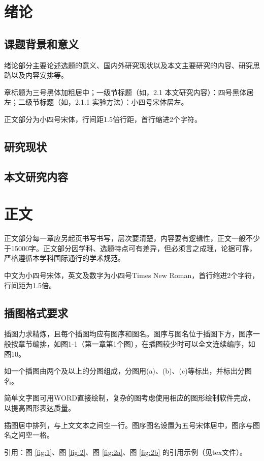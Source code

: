 \documentclass{jitthesis-2026}
\begin{document}
\mainmatter
\chapter{绪论}
\section{课题背景和意义}
绪论部分主要论述选题的意义、国内外研究现状以及本文主要研究的内容、研究思路以及内容安排等。

章标题为三号黑体加粗居中；一级节标题（如，2.1 本文研究内容）：四号黑体居左；二级节标题（如，2.1.1 实验方法）：小四号宋体居左。

正文部分为小四号宋体，行间距1.5倍行距，首行缩进2个字符。

\section{研究现状}

\section{本文研究内容}

\chapter{正文}
正文部分每一章应另起页书写书写，层次要清楚，内容要有逻辑性，正文一般不少于15000字。正文部分因学科、选题特点可有差异，但必须言之成理，论据可靠，严格遵循本学科国际通行的学术规范。

中文为小四号宋体，英文及数字为小四号Times New Roman，首行缩进2个字符，行间距为1.5倍。

\section{插图格式要求}
插图力求精炼，且每个插图均应有图序和图名。图序与图名位于插图下方，图序一般按章节编排，如图1-1（第一章第1个图），在插图较少时可以全文连续编序，如图10。

如一个插图由两个及以上的分图组成，分图用(a)、(b)、(c)等标出，并标出分图名。

简单文字图可用WORD直接绘制，复杂的图考虑使用相应的图形绘制软件完成，以提高图形表达质量。

插图居中排列，与上文文本之间空一行。图序图名设置为五号宋体居中，图序与图名之间空一格。

引用：图 \ref{fig:1}、图 \ref{fig:2}、图 \ref{fig:2a}、图 \ref{fig:2b} 的引用示例（见tex文件）。
\end{document}
